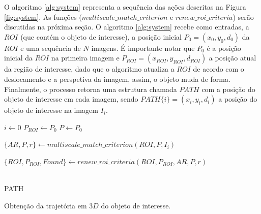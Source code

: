 O algoritmo \ref{alg:system} representa a sequência das 
ações descritas na Figura \ref{fig:system}. As funções 
 ($multiscale\_match\_criterion$ e $renew\_roi\_criteria$) serão discutidas na próxima seção. 
O algoritmo \ref{alg:system} recebe como entradas, a $ROI$ (que contém o objeto de interesse), 
a posição inicial $P_0=(x_0, y_0, d_0)$
da $ROI$   
e uma sequência de $N$ imagens. É importante notar que $P_0$ é a posição inicial
da $ROI$ na primeira imagem e $P_{ROI}=(x_{ROI}, y_{ROI}, d_{ROI})$ a posição atual da região
de interesse, dado que o algoritmo atualiza a $ROI$ de acordo com o deslocamento e a perspetiva da imagem, assim,
o objeto muda de forma. Finalmente, o processo retorna 
uma estrutura chamada $PATH$ com a posição do objeto de interesse em cada imagem, sendo $PATH\{i\}=(x_i,y_i,d_i)$
a posição do objeto de interesse na imagem $I_i$.

\begin{algorithm}
 $i \leftarrow 0$ \;
 $P_{ROI} \leftarrow P_0$ \;
 $P \leftarrow P_0$ \;
~\\
{
    $\{AR,P,r\} \leftarrow multiscale\_match\_criterion(ROI,P,I_i)$\;
    
    $\{ROI,P_{ROI},Found\} \leftarrow renew\_roi\_criteria(ROI,P_{ROI},AR,P,r)$\;
}
~\\
\Return PATH \;
\caption{Obtenção da trajetória em $3D$ do objeto de interesse.}
\label{alg:system}
\end{algorithm}

